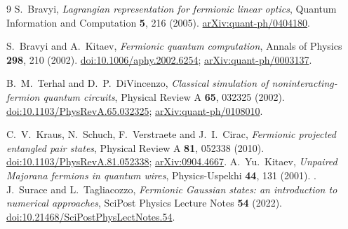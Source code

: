 \clearpage
{}
\begin{thebibliography}{9}
S.~Bravyi,
\emph{Lagrangian representation for fermionic linear optics},
Quantum Information and Computation \textbf{5}, 216 (2005).
\href{https://arxiv.org/abs/quant-ph/0404180}{arXiv:quant-ph/0404180}.

S.~Bravyi and A.~Kitaev,
\emph{Fermionic quantum computation},
Annals of Physics \textbf{298}, 210 (2002).
\href{https://doi.org/10.1006/aphy.2002.6254}{doi:10.1006/aphy.2002.6254};
\href{https://arxiv.org/abs/quant-ph/0003137}{arXiv:quant-ph/0003137}.

B.~M.~Terhal and D.~P.~DiVincenzo,
\emph{Classical simulation of noninteracting-fermion quantum circuits},
Physical Review A \textbf{65}, 032325 (2002).
\href{https://doi.org/10.1103/PhysRevA.65.032325}{doi:10.1103/PhysRevA.65.032325};
\href{https://arxiv.org/abs/quant-ph/0108010}{arXiv:quant-ph/0108010}.

C.~V.~Kraus, N.~Schuch, F.~Verstraete and J.~I.~Cirac,
\emph{Fermionic projected entangled pair states},
Physical Review A \textbf{81}, 052338 (2010).
\href{https://doi.org/10.1103/PhysRevA.81.052338}{doi:10.1103/PhysRevA.81.052338};
\href{https://arxiv.org/abs/0904.4667}{arXiv:0904.4667}.
A.~Yu.~Kitaev, \emph{Unpaired Majorana fermions in quantum wires}, Physics-Uspekhi
\textbf{44}, 131 (2001).
.
J.~Surace and L.~Tagliacozzo, \emph{Fermionic Gaussian states: an introduction to numerical
approaches}, SciPost Physics Lecture Notes \textbf{54} (2022).
\href{https://doi.org/10.21468/SciPostPhysLectNotes.54}{doi:10.21468/SciPostPhysLectNotes.54}.
\end{thebibliography}
